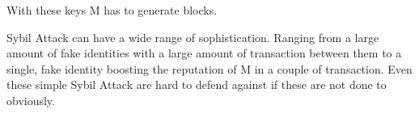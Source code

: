 
With these keys M has to generate blocks.


Sybil Attack can have a wide range of sophistication.
Ranging from a large amount of fake identities with a large amount of transaction between them
to a single, fake identity boosting the reputation of M in a couple of transaction.
Even these simple Sybil Attack are hard to defend against if these are not done to obviously.



